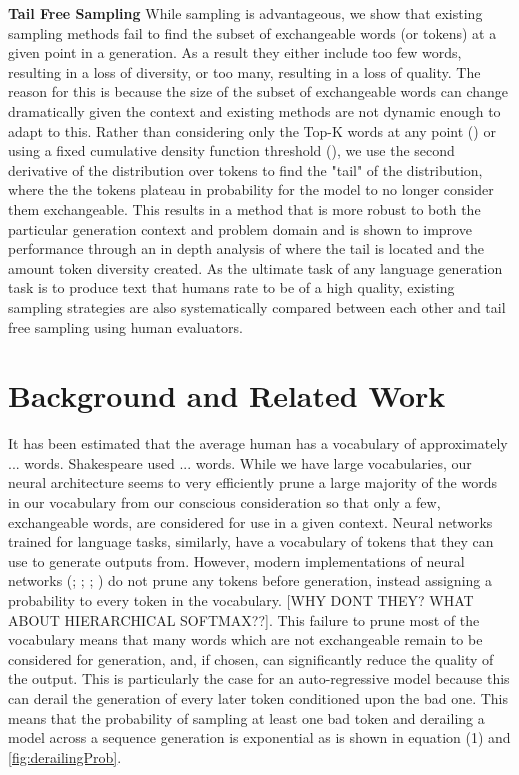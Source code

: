 \documentclass{article}
\begin{document}
\textbf{Tail Free Sampling}
While sampling is advantageous, we show that existing sampling methods fail to find the subset of exchangeable words (or tokens) at a given point in a generation. As a result they either include too few words, resulting in a loss of diversity, or too many, resulting in a loss of quality. The reason for this is because the size of the subset of exchangeable words can change dramatically given the context and existing methods are not dynamic enough to adapt to this. Rather than considering only the Top-K words at any point (\cite{TopKandWritingPrompts}) or using a fixed cumulative density function threshold (\cite{Nucleus}), we use the second derivative of the distribution over tokens to find the "tail" of the distribution, where the the tokens plateau in probability for the model to no longer consider them exchangeable. This results in a method that is more robust to both the particular generation context and problem domain and is shown to improve performance through an in depth analysis of where the tail is located and the amount token diversity created. As the ultimate task of any language generation task is to produce text that humans rate to be of a high quality, existing sampling strategies are also systematically compared between each other and tail free sampling using human evaluators. 

\section{Background and Related Work}

It has been estimated that the average human has a vocabulary of approximately ... words. Shakespeare used ... words. While we have large vocabularies, our neural architecture seems to very efficiently prune a large majority of the words in our vocabulary from our conscious consideration so that only a few, exchangeable words, are considered for use in a given context. Neural networks trained for language tasks, similarly, have a vocabulary of tokens that they can use to generate outputs from. However, modern implementations of neural networks (\cite{TopKandWritingPrompts}; \cite{radford2019language}; \cite{UnLikelihood}; \cite{XLNet}) do not prune any tokens before generation, instead assigning a probability to every token in the vocabulary. [WHY DONT THEY? WHAT ABOUT HIERARCHICAL SOFTMAX??]. This failure to prune most of the vocabulary means that many words which are not exchangeable remain to be considered for generation, and, if chosen, can significantly reduce the quality of the output. This is particularly the case for an auto-regressive model because this can derail the generation of every later token conditioned upon the bad one. This means that the probability of sampling at least one bad token and derailing a model across a sequence generation is exponential as is shown in equation (1) and \ref{fig:derailingProb}.
\end{document}
